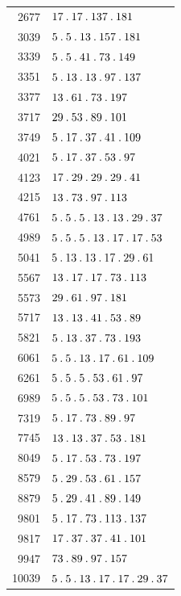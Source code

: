 %
\begingroup\small\setlength{\tabcolsep}{5pt}
\begin{longtable}{@{}r|l@{}}
2677 & $17\mathbin{.} 17\mathbin{.} 137\mathbin{.} 181$\\
3039 & $5\mathbin{.} 5\mathbin{.} 13\mathbin{.} 157\mathbin{.} 181$\\
3339 & $5\mathbin{.} 5\mathbin{.} 41\mathbin{.} 73\mathbin{.} 149$\\
3351 & $5\mathbin{.} 13\mathbin{.} 13\mathbin{.} 97\mathbin{.} 137$\\
3377 & $13\mathbin{.} 61\mathbin{.} 73\mathbin{.} 197$\\
3717 & $29\mathbin{.} 53\mathbin{.} 89\mathbin{.} 101$\\
3749 & $5\mathbin{.} 17\mathbin{.} 37\mathbin{.} 41\mathbin{.} 109$\\
4021 & $5\mathbin{.} 17\mathbin{.} 37\mathbin{.} 53\mathbin{.} 97$\\
4123 & $17\mathbin{.} 29\mathbin{.} 29\mathbin{.} 29\mathbin{.} 41$\\
4215 & $13\mathbin{.} 73\mathbin{.} 97\mathbin{.} 113$\\
4761 & $5\mathbin{.} 5\mathbin{.} 5\mathbin{.} 13\mathbin{.} 13\mathbin{.} 29\mathbin{.} 37$\\
4989 & $5\mathbin{.} 5\mathbin{.} 5\mathbin{.} 13\mathbin{.} 17\mathbin{.} 17\mathbin{.} 53$\\
5041 & $5\mathbin{.} 13\mathbin{.} 13\mathbin{.} 17\mathbin{.} 29\mathbin{.} 61$\\
5567 & $13\mathbin{.} 17\mathbin{.} 17\mathbin{.} 73\mathbin{.} 113$\\
5573 & $29\mathbin{.} 61\mathbin{.} 97\mathbin{.} 181$\\
5717 & $13\mathbin{.} 13\mathbin{.} 41\mathbin{.} 53\mathbin{.} 89$\\
5821 & $5\mathbin{.} 13\mathbin{.} 37\mathbin{.} 73\mathbin{.} 193$\\
6061 & $5\mathbin{.} 5\mathbin{.} 13\mathbin{.} 17\mathbin{.} 61\mathbin{.} 109$\\
6261 & $5\mathbin{.} 5\mathbin{.} 5\mathbin{.} 53\mathbin{.} 61\mathbin{.} 97$\\
6989 & $5\mathbin{.} 5\mathbin{.} 5\mathbin{.} 53\mathbin{.} 73\mathbin{.} 101$\\
7319 & $5\mathbin{.} 17\mathbin{.} 73\mathbin{.} 89\mathbin{.} 97$\\
7745 & $13\mathbin{.} 13\mathbin{.} 37\mathbin{.} 53\mathbin{.} 181$\\
8049 & $5\mathbin{.} 17\mathbin{.} 53\mathbin{.} 73\mathbin{.} 197$\\
8579 & $5\mathbin{.} 29\mathbin{.} 53\mathbin{.} 61\mathbin{.} 157$\\
8879 & $5\mathbin{.} 29\mathbin{.} 41\mathbin{.} 89\mathbin{.} 149$\\
9801 & $5\mathbin{.} 17\mathbin{.} 73\mathbin{.} 113\mathbin{.} 137$\\
9817 & $17\mathbin{.} 37\mathbin{.} 37\mathbin{.} 41\mathbin{.} 101$\\
9947 & $73\mathbin{.} 89\mathbin{.} 97\mathbin{.} 157$\\
10039 & $5\mathbin{.} 5\mathbin{.} 13\mathbin{.} 17\mathbin{.} 17\mathbin{.} 29\mathbin{.} 37$\\

\end{longtable}
